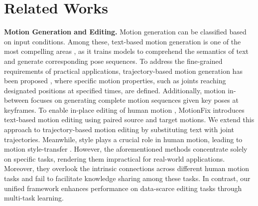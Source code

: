 \section{Related Works}
\textbf{Motion Generation and Editing.} Motion generation can be classified based on input conditions. Among these, text-based motion generation is one of the most compelling areas \cite{zhang2022motiondiffuse,tevet2022motionclip,tevet2023human,Guo_2022_CVPR,chen2023executing,guo2024momask,guo2022tm2t,wang2024motiongpt,jiang2023motiongpt,kim2023flame,lin2023motion,lu2023humantomato,plappert2016kit,zhang2023generating,guo2020action2motion,petrovich2021action}, as it trains models to comprehend the semantics of text and generate corresponding pose sequences. To address the fine-grained requirements of practical applications, trajectory-based motion generation has been proposed \cite{karunratanakul2023guided,shafir2023human,xie2023omnicontrol,dai2025motionlcm,zhang2023finemogen}, where specific motion properties, such as joints reaching designated positions at specified times, are defined. Additionally, motion in-between \cite{tevet2023human,jiang2023motiongpt,cohan2024flexible,qin2022motion,pinyoanuntapong2024mmm} focuses on generating complete motion sequences given key poses at keyframes. To enable in-place editing of human motion \cite{goel2024iterative,athanasiou2024motionfix}, MotionFix \cite{athanasiou2024motionfix} introduces text-based motion editing using paired source and target motions. We extend this approach to trajectory-based motion editing by substituting text with joint trajectories. Meanwhile, style plays a crucial role in human motion, leading to motion style-transfer \cite{jang2022motion,aberman2020unpaired,zhong2025smoodi,Song_2024_CVPR}. However, the aforementioned methods concentrate solely on specific tasks, rendering them impractical for real-world applications. Moreover, they overlook the intrinsic connections across different human motion tasks and fail to facilitate knowledge sharing among these tasks. In contrast, our unified framework enhances performance on data-scarce editing tasks through multi-task learning.

